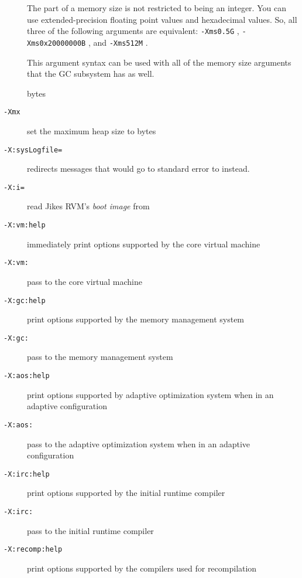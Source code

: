 \begin{description}
{      The  part of a memory size is not restricted to being an
      integer.  You can use extended-precision floating point values and
      hexadecimal values.  So, all three of the following arguments are
      equivalent:
      \texttt{-Xms0.5G} , \texttt{-Xms0x20000000B} , and \texttt{-Xms512M} .

      This argument syntax can be used with all of the memory size
      arguments that the GC subsystem has as well.
  } %
bytes

\item[{\tt -Xmx\Mmeta{number}\Mmeta{unit}}]
set the maximum heap size to  bytes


\item[{\tt -X:sysLogfile=\Mmeta{filename}}]
redirects messages that would go to standard error to  instead.

\item[{\tt -X:i=\Mmeta{filename}}]
read Jikes RVM's \emph{boot image} from 

\item[{\tt -X:vm\Mlsq{}:help\Mrsq{}}]
immediately print options supported by the core virtual machine

\item[{\tt -X:vm:\Mmeta{option}}]
pass  to the core virtual machine

\item[{\tt -X:gc\Mlsq{}:help\Mrsq}]
print options supported by the memory management system

\item[{\tt -X:gc:\Mmeta{option}}]
pass  to the memory management system

\item[{\tt -X:aos\Mlsq{}:help\Mrsq{}}]
print options supported by adaptive optimization system when in an
adaptive configuration

\item[{\tt -X:aos:\Mmeta{option}}]
pass  to the adaptive optimization system when in an adaptive configuration

\item[{\tt -X:irc\Mlsq{}:help\Mrsq{}}]
print options supported by the initial runtime compiler

\item[{\tt -X:irc:\Mmeta{option}}]
pass  to the initial runtime compiler

\item[{\tt -X:recomp\Mlsq{}:help\Mrsq{}}]
print options supported by the compilers used for recompilation


\end{description}
